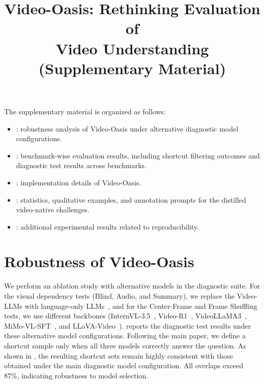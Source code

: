 \title{Video-Oasis: Rethinking Evaluation of \\ Video Understanding \\ (Supplementary Material)} 
\author{}
\institute{}
\maketitle
\vspace{-6mm}

The supplementary material is organized as follows:

\begin{itemize}[topsep=2pt,itemsep=1pt]
\item {}: robustness analysis of Video-Oasis under alternative diagnostic model configurations.
\item {}: benchmark-wise evaluation results, including shortcut filtering outcomes and diagnostic test results across benchmarks.
\item {}: implementation details of Video-Oasis.
\item {}: statistics, qualitative examples, and annotation prompts for the distilled video-native challenges.
\item {}: additional experimental results related to reproducibility.

\end{itemize} \vspace{-4mm}

\section{Robustness of Video-Oasis} \label{sec:a}

    We perform an ablation study with alternative models in the diagnostic suite.
    For the visual dependency tests (Blind, Audio, and Summary), we replace the Video-LLMs with language-only LLMs~\cite{llama3,mistral,qwen3}, and for the Center-Frame and Frame Shuffling tests, we use different backbones (InternVL-3.5~\cite{internvl35}, Video-R1~\cite{videor1}, VideoLLaMA3~\cite{videollama}, MiMo-VL-SFT~\cite{mimo}, and LLaVA-Video~\cite{zhang2024llava}). 
     reports the diagnostic test results under these alternative model configurations.
    Following the main paper, we define a shortcut sample only when all three models correctly answer the question.
    As shown in , the resulting shortcut sets remain highly consistent with those obtained under the main diagnostic model configuration.
    All overlaps exceed 87\%, indicating robustness to model selection.
            
